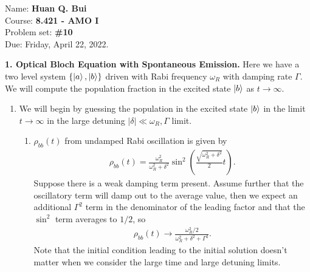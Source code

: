 \documentclass{article}
\theoremstyle{definition}
\newcommand{\f}[2]{\frac{#1}{#2}}
\newcommand{\lp}{\left(}
\newcommand{\rp}{\right)}
\begin{document}
\begin{framed}
\noindent Name: \textbf{Huan Q. Bui}\\
Course: \textbf{8.421 - AMO I}\\
Problem set: \textbf{\#10}\\
Due: Friday, April 22, 2022.
\end{framed}



\noindent \textbf{1. Optical Bloch Equation with Spontaneous Emission. } Here we have a two level system $\{ \ket{a}, \ket{b} \}$ driven with Rabi frequency $\omega_R$ with damping rate $\Gamma$. We will compute the population fraction in the excited state $\ket{b}$ as $t\to \infty$. 

\begin{enumerate}[label=(\alph*)]
	\item We will begin by guessing the population in the excited state $\ket{b}$ in the limit $t\to \infty$ in the large detuning $|\delta| \ll \omega_R, \Gamma$ limit. 
	\begin{enumerate}[label=(\roman*)]
		\item $\rho_{bb}(t)$ from undamped Rabi oscillation is given by 
		\begin{align*}
		\rho_{bb}(t) = \f{\omega_R^2}{\omega_R^2 + \delta^2} \sin^2\lp \f{\sqrt{\omega_R^2 + \delta^2}}{2} t \rp.
		\end{align*}
		Suppose there is a weak damping term present. Assume further that the oscillatory term will damp out to the average value, then we expect an additional $\Gamma^2$ term in the denominator of the leading factor and that the $\sin^2$ term averages to $1/2$, so
		\begin{align*}
		\rho_{bb}(t) \to \f{\omega_R^2/2}{\omega_R^2 + \delta^2 + \Gamma^2}.
		\end{align*}
		Note that the initial condition leading to the initial solution doesn't matter when we consider the large time and large detuning limits.
		

\end{enumerate}
\end{enumerate}
\end{document}
